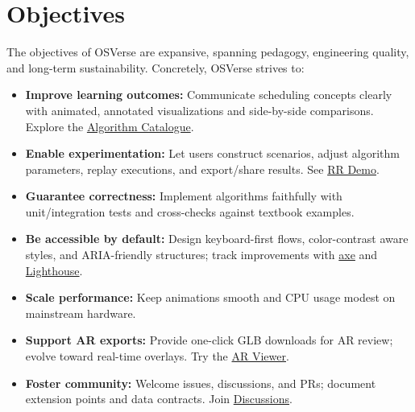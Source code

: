 \documentclass[12pt,a4paper,oneside]{report}
\begin{document}
\section{Objectives}
The objectives of OSVerse are expansive, spanning pedagogy, engineering quality, and long-term sustainability. Concretely, OSVerse strives to:
\begin{itemize}
  \item \textbf{Improve learning outcomes:} Communicate scheduling concepts clearly with animated, annotated visualizations and side-by-side comparisons. Explore the \href{https://osverse.shreyjain.me/algorithms}{Algorithm Catalogue}.
  \item \textbf{Enable experimentation:} Let users construct scenarios, adjust algorithm parameters, replay executions, and export/share results. See \href{https://osverse.shreyjain.me/round-robin}{RR Demo}.
  \item \textbf{Guarantee correctness:} Implement algorithms faithfully with unit/integration tests and cross-checks against textbook examples.
  \item \textbf{Be accessible by default:} Design keyboard-first flows, color-contrast aware styles, and ARIA-friendly structures; track improvements with \href{https://www.deque.com/axe/}{axe} and \href{https://developers.google.com/web/tools/lighthouse}{Lighthouse}.
  \item \textbf{Scale performance:} Keep animations smooth and CPU usage modest on mainstream hardware.
  \item \textbf{Support AR exports:} Provide one-click GLB downloads for AR review; evolve toward real-time overlays. Try the \href{https://osverse.shreyjain.me/ar-viewer}{AR Viewer}.
  \item \textbf{Foster community:} Welcome issues, discussions, and PRs; document extension points and data contracts. Join \href{https://github.com/shreyjain14/osverse-final/issues}{Discussions}.
\end{itemize}
\end{document}
